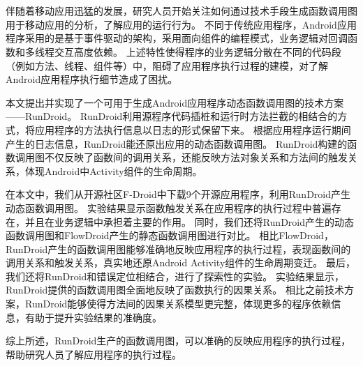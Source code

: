 
\vspace{-2.5cm}
\chapter*{}
\vspace{-1cm}

\setlength{\baselineskip}{25pt}	

伴随着移动应用迅猛的发展，研究人员开始关注如何通过技术手段生成函数调用图用于移动应用的分析，了解应用的运行行为。
不同于传统应用程序，Android应用程序采用的是基于事件驱动的架构，采用面向组件的编程模式，业务逻辑对回调函数和多线程交互高度依赖。
上述特性使得程序的业务逻辑分散在不同的代码段（例如方法、线程、组件等）中，阻碍了应用程序执行过程的建模，对了解Android应用程序执行细节造成了困扰。



本文提出并实现了一个可用于生成Android应用程序动态函数调用图的技术方案——RunDroid。
RunDroid利用源程序代码插桩和运行时方法拦截的相结合的方式，将应用程序的方法执行信息以日志的形式保留下来。
根据应用程序运行期间产生的日志信息，RunDroid能还原出应用的动态函数调用图。
RunDroid构建的函数调用图不仅反映了函数间的调用关系，还能反映方法对象关系和方法间的触发关系，体现Android中Activity组件的生命周期。




在本文中，我们从开源社区F-Droid中下载9个开源应用程序，利用RunDroid产生动态函数调用图。
实验结果显示函数触发关系在应用程序的执行过程中普遍存在，并且在业务逻辑中承担着主要的作用。
同时，我们还将RunDroid产生的动态函数调用图和FlowDroid产生的静态函数调用图进行对比。
相比FlowDroid，RunDroid产生的函数调用图能够准确地反映应用程序的执行过程，表现函数间的调用关系和触发关系，真实地还原Android Activity组件的生命周期变迁。
最后，我们还将RunDroid和错误定位相结合，进行了探索性的实验。
实验结果显示，RunDroid提供的函数调用图全面地反映了函数执行的因果关系。
相比之前技术方案，RunDroid能够使得方法间的因果关系模型更完整，体现更多的程序依赖信息，有助于提升实验结果的准确度。


综上所述，RunDroid生产的函数调用图，可以准确的反映应用程序的执行过程，帮助研究人员了解应用程序的执行过程。

\hspace{-0.5cm}
 
